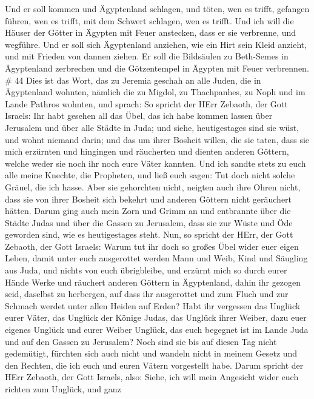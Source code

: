 Und er soll kommen und Ägyptenland schlagen, und töten, wen es trifft,
gefangen führen, wen es trifft, mit dem Schwert schlagen, wen es trifft.
 Und ich will die Häuser der Götter in Ägypten mit Feuer
anstecken, dass er sie verbrenne, und wegführe. Und er soll sich
Ägyptenland anziehen, wie ein Hirt sein Kleid anzieht, und mit Frieden
von dannen ziehen.  Er soll die Bildsäulen zu Beth-Semes in
Ägyptenland zerbrechen und die Götzentempel in Ägypten mit Feuer
verbrennen. \# 44  Dies ist das Wort, das zu Jeremia geschah
an alle Juden, die in Ägyptenland wohnten, nämlich die zu Migdol, zu
Thachpanhes, zu Noph und im Lande Pathros wohnten, und sprach:
 So spricht der HErr Zebaoth, der Gott Israels: Ihr habt
gesehen all das Übel, das ich habe kommen lassen über Jerusalem und über
alle Städte in Juda; und siehe, heutigestages sind sie wüst, und wohnt
niemand darin;  und das um ihrer Bosheit willen, die sie
taten, dass sie mich erzürnten und hingingen und räucherten und dienten
anderen Göttern, welche weder sie noch ihr noch eure Väter kannten.
 Und ich sandte stets zu euch alle meine Knechte, die
Propheten, und ließ euch sagen: Tut doch nicht solche Gräuel, die ich
hasse.  Aber sie gehorchten nicht, neigten auch ihre Ohren
nicht, dass sie von ihrer Bosheit sich bekehrt und anderen Göttern nicht
geräuchert hätten.  Darum ging auch mein Zorn und Grimm an
und entbrannte über die Städte Judas und über die Gassen zu Jerusalem,
dass sie zur Wüste und Öde geworden sind, wie es heutigestages steht.
 Nun, so spricht der HErr, der Gott Zebaoth, der Gott
Israels: Warum tut ihr doch so großes Übel wider euer eigen Leben, damit
unter euch ausgerottet werden Mann und Weib, Kind und Säugling aus Juda,
und nichts von euch übrigbleibe,  und erzürnt mich so durch
eurer Hände Werke und räuchert anderen Göttern in Ägyptenland, dahin ihr
gezogen seid, daselbst zu herbergen, auf dass ihr ausgerottet und zum
Fluch und zur Schmach werdet unter allen Heiden auf Erden? 
Habt ihr vergessen das Unglück eurer Väter, das Unglück der Könige
Judas, das Unglück ihrer Weiber, dazu euer eigenes Unglück und eurer
Weiber Unglück, das euch begegnet ist im Lande Juda und auf den Gassen
zu Jerusalem?  Noch sind sie bis auf diesen Tag nicht
gedemütigt, fürchten sich auch nicht und wandeln nicht in meinem Gesetz
und den Rechten, die ich euch und euren Vätern vorgestellt habe.
 Darum spricht der HErr Zebaoth, der Gott Israels, also:
Siehe, ich will mein Angesicht wider euch richten zum Unglück, und ganz
